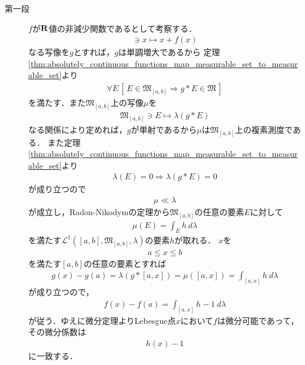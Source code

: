 	\begin{sketch}\mbox{}
		\begin{description}
			\item[第一段]
				$f$が$\mathbf{R}$値の非減少関数であるとして考察する．
				\begin{align}
					[a,b] \ni x \longmapsto x + f(x)
				\end{align}
				なる写像を$g$とすれば，$g$は単調増大であるから
				定理\ref{thm:absolutely_continuous_functions_map_measurable_set_to_measurable_set}より
				\begin{align}
					\forall E\, \left[\, E \in \mathfrak{M}_{[a,b]} \Longrightarrow g \ast E \in \mathfrak{M}\, \right]
				\end{align}
				を満たす．また$\mathfrak{M}_{[a,b]}$上の写像$\mu$を
				\begin{align}
					\mathfrak{M}_{[a,b]} \ni E \longmapsto \lambda(g \ast E)
				\end{align}
				なる関係により定めれば，$g$が単射であるから$\mu$は$\mathfrak{M}_{[a,b]}$上の複素測度である．
				また定理\ref{thm:absolutely_continuous_functions_map_measurable_set_to_measurable_set}より
				\begin{align}
					\lambda(E) = 0 \Longrightarrow \lambda(g \ast E) = 0
				\end{align}
				が成り立つので
				\begin{align}
					\mu \ll \lambda
				\end{align}
				が成立し，Radon-Nikodymの定理から$\mathfrak{M}_{[a,b]}$の任意の要素$E$に対して
				\begin{align}
					\mu(E) = \int_E h\ d\lambda
				\end{align}
				を満たす$\mathscr{L}^1([a,b],\mathfrak{M}_{[a,b]},\lambda)$の要素$h$が取れる．
				$x$を
				\begin{align}
					a \leq x \leq b
				\end{align}
				を満たす$[a,b]$の任意の要素とすれば
				\begin{align}
					g(x) - g(a) = \lambda(g \ast [a,x]) = \mu([a,x]) = \int_{[a,x]} h\ d\lambda
				\end{align}
				が成り立つので，
				\begin{align}
					f(x) - f(a) = \int_{[a,x]} h-1\ d\lambda
				\end{align}
				が従う．ゆえに微分定理よりLebesgue点$x$において$f$は微分可能であって，その微分係数は
				\begin{align}
					h(x) - 1
				\end{align}
				に一致する．

\end{description}
\end{sketch}
